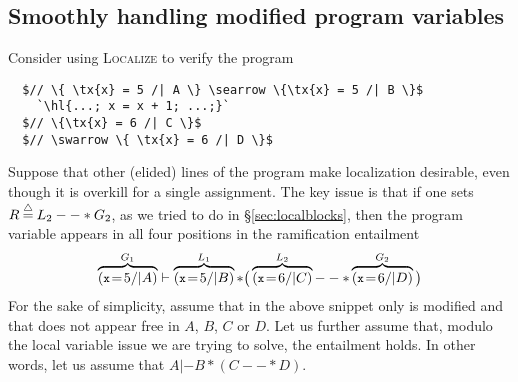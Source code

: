
\subsection{Smoothly handling modified program variables}
\label{sec:freevars}

Consider using \textsc{Localize} to verify the program
\vspace{-1ex}
\begin{lstlisting}
  $// \{ \tx{x} = 5 /| A \} \searrow \{\tx{x} = 5 /| B \}$
    `\hl{...; x = x + 1; ...;}`
  $// \{\tx{x} = 6 /| C \}$
  $// \swarrow \{ \tx{x} = 6 /| D \}$ 
\end{lstlisting}
\vspace{-1ex}
Suppose that other (elided) lines of the program make localization desirable, even though it is overkill for a single assignment.  The key issue is that if one sets $R \mathbin{\stackrel{\triangle}{=}} L_2 --* G_2$, as
we tried to do in \S\ref{sec:localblocks}, then the program variable {} appears in all four positions in the ramification entailment
\vspace{-1ex}
\[
\overbrace{(\li{x} \! = \! 5 /| A)}^{G_1} |- \overbrace{(\li{x} \! = \! 5 /| B)}^{L_1} * \big(\overbrace{(\li{x} \! = \! 6 /| C)}^{L_2} --* \overbrace{(\li{x} \! = \! 6 /| D)}^{G_2}\big)
\vspace{-1ex}
\]
For the sake of simplicity, assume that in the above snippet only  is modified
and that  does not appear free in $A$, $B$, $C$ or $D$.  Let us further assume
that, modulo the local variable issue we are trying to solve, the entailment holds.
In other words, let us assume that $A |- B * (C --* D)$.

